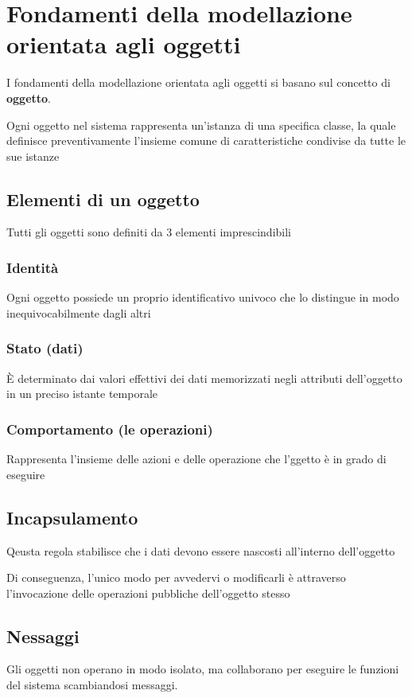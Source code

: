\section{Fondamenti della modellazione orientata agli oggetti}
I fondamenti della modellazione orientata agli oggetti si basano sul concetto di \textbf{oggetto}.

Ogni oggetto nel sistema rappresenta un'istanza di una specifica classe, la quale definisce preventivamente l'insieme comune di caratteristiche condivise da tutte le sue istanze

\subsection{Elementi di un oggetto}
Tutti gli oggetti sono definiti da 3 elementi imprescindibili
\subsubsection{Identità}
Ogni oggetto possiede un proprio identificativo univoco che lo distingue in modo inequivocabilmente dagli altri
\subsubsection{Stato (dati)}
È determinato dai valori effettivi dei dati memorizzati negli attributi dell'oggetto in un preciso istante temporale
\subsubsection{Comportamento (le operazioni)}
Rappresenta l'insieme delle azioni e delle operazione che l'ggetto è in grado di eseguire

\subsection{Incapsulamento}
Qeusta regola stabilisce che i dati devono essere nascosti all'interno dell'oggetto

Di conseguenza, l'unico modo per avvedervi o modificarli è attraverso l'invocazione delle operazioni pubbliche dell'oggetto stesso

\subsection{Nessaggi}
Gli oggetti non operano in modo isolato, ma collaborano per eseguire le funzioni del sistema scambiandosi messaggi.

